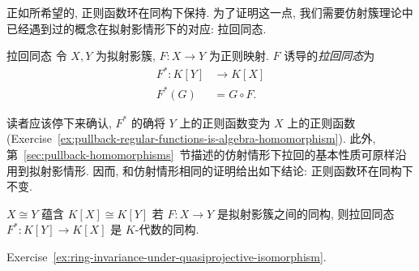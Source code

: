 正如所希望的, 正则函数环在同构下保持. 为了证明这一点, 我们需要仿射簇理论中已经遇到过的概念在拟射影情形下的对应: 拉回同态.

\begin{Definition}{拉回同态}\leavevmode\label{def:pullback-on-regular-function-rings}
令 $X,Y$ 为拟射影簇, $F:X\to Y$ 为正则映射. $F$ 诱导的\emph{拉回同态}为
\[
  \begin{aligned}
    F^{*}:K[Y]&\to K[X]\\
    F^{*}(G)&=G\circ F.
  \end{aligned}
\]
\end{Definition}

读者应该停下来确认, $F^{*}$ 的确将 $Y$ 上的正则函数变为 $X$ 上的正则函数 (Exercise~\ref{ex:pullback-regular-functions-is-algebra-homomorphism}). 此外, 第~\ref{sec:pullback-homomorphisms}~节描述的仿射情形下拉回的基本性质可原样沿用到拟射影情形. 因而, 和仿射情形相同的证明给出如下结论: 正则函数环在同构下不变.

\begin{Proposition}{$X\cong Y$ 蕴含 \ensuremath{K[X]\cong K[Y]}}\leavevmode\label{prop:quasiprojective-isomorphism-induces-regular-function-ring-isomorphism}
若 $F:X\to Y$ 是拟射影簇之间的同构, 则拉回同态 $F^{*}:K[Y]\to K[X]$ 是 $K$-代数的同构.
\end{Proposition}
\begin{Proof}
Exercise~\ref{ex:ring-invariance-under-quasiprojective-isomorphism}.
\end{Proof}


